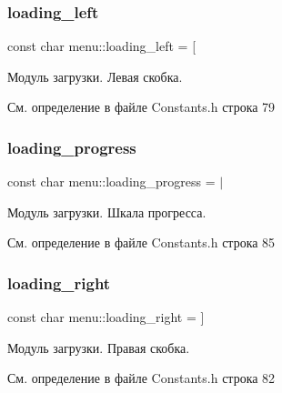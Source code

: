 \mbox{\label{namespacemenu_a56af6a2d586e2b6baa4ebf128a690266}} 
\subsubsection{\texorpdfstring{loading\+\_\+left}{loading\_left}}
{\footnotesize\ttfamily const char menu\+::loading\+\_\+left = \textquotesingle{}\mbox{[}\textquotesingle{}}

Модуль загрузки. Левая скобка. 

См. определение в файле Constants.\+h строка 79

\mbox{\label{namespacemenu_ab79f369195d81dcb241b1ab5269c9d3d}} 
\subsubsection{\texorpdfstring{loading\+\_\+progress}{loading\_progress}}
{\footnotesize\ttfamily const char menu\+::loading\+\_\+progress = \textquotesingle{}$\vert$\textquotesingle{}}

Модуль загрузки. Шкала прогресса. 

См. определение в файле Constants.\+h строка 85

\mbox{\label{namespacemenu_a272b2c0c591457b2aeccaae0c122a1fc}} 
\subsubsection{\texorpdfstring{loading\+\_\+right}{loading\_right}}
{\footnotesize\ttfamily const char menu\+::loading\+\_\+right = \textquotesingle{}\mbox{]}\textquotesingle{}}

Модуль загрузки. Правая скобка. 

См. определение в файле Constants.\+h строка 82

\mbox{\label{namespacemenu_aa3bc0d7f62e04dc52dd8f276902448ae}} 
